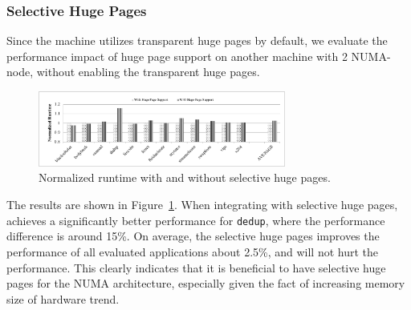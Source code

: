 
\subsubsection{Selective Huge Pages} 
\label{sec:hugepage}

Since the machine utilizes transparent huge pages by default, we evaluate the performance impact of huge page support on another machine with 2 NUMA-node, without enabling the transparent huge pages.

\begin{figure}[!h]
    \centering
    \includegraphics[width=3.2in]{figure/hugepage.pdf}
    \caption{Normalized runtime with and without selective huge pages.}
    \label{fig:hugepage}
\end{figure}

The results are shown in Figure~\ref{fig:hugepage}. When integrating with selective huge pages, \NM{} achieves a significantly better performance for \texttt{dedup}, where the performance difference is around 15\%. On average, the selective huge pages improves the performance of all evaluated applications about 2.5\%, and will not hurt the performance. This clearly indicates that it is beneficial to have selective huge pages for the NUMA architecture, especially given the fact of increasing memory size of hardware trend.  


